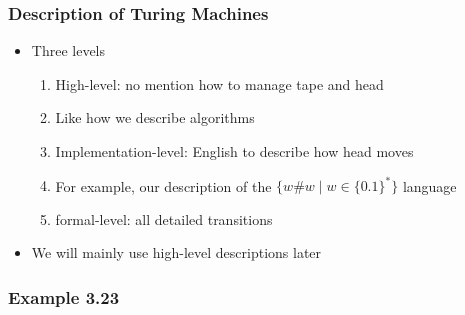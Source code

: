 \begin{frame}[allowframebreaks] \frametitle{Description of Turing Machines}
  \begin{itemize}
\item Three levels
  \begin{enumerate}
  \item High-level: no mention how to manage tape and head

  \item [] Like how we describe algorithms
  \item Implementation-level: English to describe how head moves

  \item [] For example, our description of the
    $\{w\#w\mid w \in \{0.1\}^*\}$ language

\item
  formal-level: all detailed transitions
\end{enumerate}
\item We will mainly use high-level descriptions later

\end{itemize}\end{frame} \begin{frame}[allowframebreaks] \frametitle{Example 3.23}


\end{frame}
